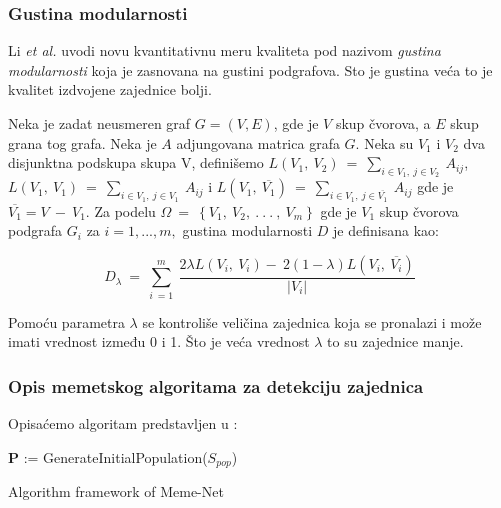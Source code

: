 \documentclass[a4paper]{article}
\begin{document}
\subsubsection{Gustina modularnosti}

Li \textit{et al.} \cite{li} uvodi novu kvantitativnu meru kvaliteta pod nazivom \textit{gustina modularnosti} koja je zasnovana na gustini podgrafova. Sto je gustina veća to je kvalitet izdvojene zajednice bolji.

Neka je zadat neusmeren graf $G = (V, E)$, gde je $V$ skup čvorova, a $E$ skup grana tog grafa.
Neka je $A$ adjungovana matrica grafa $G$. Neka su $V_1$ i $V_2$ dva disjunktna podskupa skupa V, definišemo $L\left(V_1,\:V_2\right)\:=\:\sum _{i\in V_1,\:j\in V_2}\:A_{ij}$, 
$L\left(V_1,\:V_1\right)\:=\:\sum _{i\in V_1,\:j\in V_1}\:A_{ij}$ i
$L\left(V_1,\:\overline{V_1}\right)\:=\:\sum _{i\in V_1,\:j\in \overline{V_1}}\:A_{ij}$ gde je  $\overline{V_1}=V\:-\:V_1$. Za podelu $\Omega \:=\:\left\{V_1,\:V_2,\:.\:.\:.\:,\:V_m\right\}$ gde je $V_1$
skup čvorova podgrafa $G_i$ za $i=1, . . ., m,$ gustina modularnosti $D$ je definisana kao:

\begin{equation}
D_\lambda\:=\:\sum _{i\:=1}^m\:\frac{2\lambda L\left(V_i,\:V_i\right)-\:2\left(1-\lambda\right)L\left(V_i,\:\overline{V_i}\right)}{\left|V_i\right|}
\end{equation}

Pomoću parametra $\lambda$ se kontroliše veličina zajednica koja se pronalazi i može imati vrednost između 0 i 1. Što je veća vrednost $\lambda$ to su zajednice manje.

\subsubsection{Opis memetskog algoritama za detekciju zajednica}

Opisaćemo algoritam predstavljen u \cite{gong}:

\begin{minipage}{0.9\linewidth}%
\begin{algorithm}[H]
\SetAlgoLined
{}
\textbf{P} := GenerateInitialPopulation($S_{pop}$)
\;
 \caption{Algorithm framework of Meme-Net}
\end{algorithm}
\end{minipage}
\end{document}
